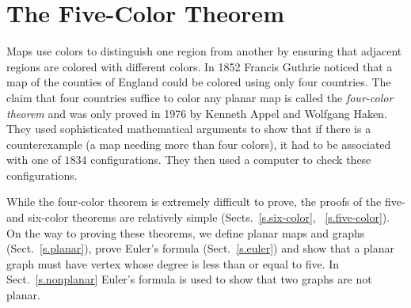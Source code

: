 

\chapter{The Five-Color Theorem}\label{c.five}




Maps use colors to distinguish one region from another by ensuring that adjacent regions are colored with different colors. In 1852 Francis Guthrie noticed that a map of the counties of England could be colored using only four countries. The claim that four countries suffice to color any planar map is called the \emph{four-color theorem} and was only proved in 1976 by Kenneth Appel and Wolfgang Haken. They used sophisticated mathematical arguments to show that if there is a counterexample (a map needing more than four colors), it had to be associated with one of $1834$ configurations. They then used a computer to check these configurations.

While the four-color theorem is extremely difficult to prove, the proofs of the five- and six-color theorems are relatively simple (Sects.~\ref{s.six-color}, ~\ref{s.five-color}). On the way to proving these theorems, we define planar maps and graphs (Sect.~\ref{s.planar}), prove Euler's formula (Sect.~\ref{s.euler}) and show that a planar graph must have vertex whose degree is less than or equal to five. In Sect.~\ref{s.nonplanar} Euler's formula is used to show that two graphs are not planar.

